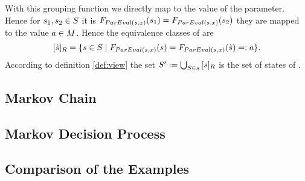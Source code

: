 \documentclass[preview]{standalone}
\begin{document}
With this grouping function we directly map to the value of the parameter. Hence for ${s}_1, {s}_2 \in {S}$ it is ${{{F}}_{{ParEval}({s},{x})}}({s}_1) = {{{F}}_{{ParEval}({s},{x})}}({s}_2)$ \iffN they are mapped to the value ${a} \in {\ensuremath{{M}}}$. Hence the equivalence classes of \eqrelview are
\[
\eqclassv{\smstate} = \{ \state \in \states \mid \gfctparamvaleq(\state) = \gfctparamvaleq(\smstate) =: \paramval\}.
\]
According to definition \ref{def:view} the set ${S}' := \bigcup_{{S} \in {s}} {{[{s}]_{{R}}}}$ is the set of states of \viewparamvaleq.


\subsection{Markov Chain}
\subsection{Markov Decision Process}
\subsection{Comparison of the Examples}
\end{document}
